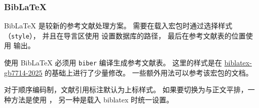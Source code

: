 \documentclass[a4paper]{ltxdoc}
\DeclareRobustCommand\file{\nolinkurl}
\DeclareRobustCommand\pkg{\textsf}
\DeclareRobustCommand\opt{\texttt}
\begin{document}
\subsubsection{BibLaTeX}

BibLaTeX 是较新的参考文献处理方案。
需要在载入宏包时通过选择样式（\opt{style}），
并且在导言区使用  设置数据库的路径，
最后在参考文献表的位置使用  输出。
\begin{latex}
  \usepackage[style=sysuthesis-authoryear]{biblatex}
  
\end{latex}

使用 BibLaTeX 必须用 \file{biber} 编译生成参考文献表。
这里的样式是在 \href{https://ctan.org/pkg/biblatex-gb7714-2015}{biblatex-gb7714-2025}
的基础上进行了少量修改。
一些额外用法可以参考该宏包的文档。

对于顺序编码制，文献引用标注默认为上标样式。
如果要切换为与正文平排，一种方法是使用 ，
另一种是载入 \pkg{biblatex} 时统一设置。
\begin{latex}
  \usepackage[bibstyle=sysuthesis-numeric,
              citestyle=sysuthesis-inline]{biblatex}
\end{latex}
\end{document}
